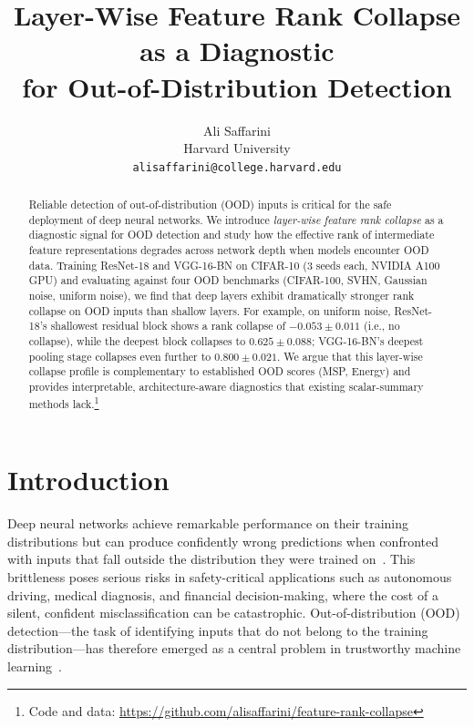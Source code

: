 \documentclass{article}
\title{Layer-Wise Feature Rank Collapse as a Diagnostic\\for Out-of-Distribution Detection}
\author{
  Ali Saffarini \\
  Harvard University \\
  \texttt{alisaffarini@college.harvard.edu}
}
\begin{document}
\maketitle

\begin{abstract}
Reliable detection of out-of-distribution (OOD) inputs is critical for the safe deployment of deep neural networks. We introduce \emph{layer-wise feature rank collapse} as a diagnostic signal for OOD detection and study how the effective rank of intermediate feature representations degrades across network depth when models encounter OOD data. Training ResNet-18 and VGG-16-BN on CIFAR-10 (3 seeds each, NVIDIA A100 GPU) and evaluating against four OOD benchmarks (CIFAR-100, SVHN, Gaussian noise, uniform noise), we find that deep layers exhibit dramatically stronger rank collapse on OOD inputs than shallow layers. For example, on uniform noise, ResNet-18's shallowest residual block shows a rank collapse of $-0.053 \pm 0.011$ (i.e., no collapse), while the deepest block collapses to $0.625 \pm 0.088$; VGG-16-BN's deepest pooling stage collapses even further to $0.800 \pm 0.021$. We argue that this layer-wise collapse profile is complementary to established OOD scores (MSP, Energy) and provides interpretable, architecture-aware diagnostics that existing scalar-summary methods lack.\footnote{Code and data: \url{https://github.com/alisaffarini/feature-rank-collapse}}
\end{abstract}

\section{Introduction}
\label{sec:intro}

Deep neural networks achieve remarkable performance on their training distributions but can produce confidently wrong predictions when confronted with inputs that fall outside the distribution they were trained on~\citep{nguyen2015deep}. This brittleness poses serious risks in safety-critical applications such as autonomous driving, medical diagnosis, and financial decision-making, where the cost of a silent, confident misclassification can be catastrophic. Out-of-distribution (OOD) detection---the task of identifying inputs that do not belong to the training distribution---has therefore emerged as a central problem in trustworthy machine learning~\citep{hendrycks2017baseline,amodei2016concrete}.
\end{document}
